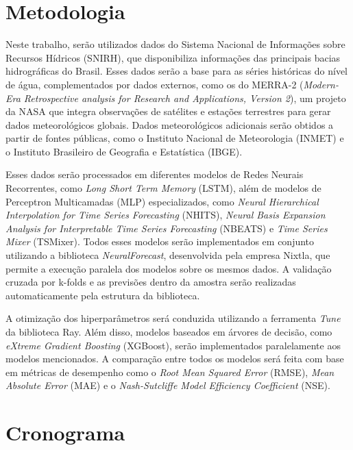 \documentclass[
	12pt,				%
	openright,			%
	a4paper,			%
	english,			%
	french,				%
	spanish,			%
	brazil				%
	]{article}
\begin{document}
\section{Metodologia}
Neste trabalho, serão utilizados dados do Sistema Nacional de Informações sobre Recursos Hídricos (SNIRH), que disponibiliza informações das principais bacias hidrográficas do Brasil\cite{snirh}. Esses dados serão a base para as séries históricas do nível de água, complementados por dados externos, como os do MERRA-2 (\textit{Modern-Era Retrospective analysis for Research and Applications, Version 2}), um projeto da NASA que integra observações de satélites e estações terrestres para gerar dados meteorológicos globais\cite{nasa}. Dados meteorológicos adicionais serão obtidos a partir de fontes públicas, como o Instituto Nacional de Meteorologia (INMET) e o Instituto Brasileiro de Geografia e Estatística (IBGE)\cite{inmet}\cite{ibge}.

Esses dados serão processados em diferentes modelos de Redes Neurais Recorrentes, como \textit{Long Short Term Memory} (LSTM)\cite{hochreiter}, além de modelos de Perceptron Multicamadas (MLP) especializados, como \textit{Neural Hierarchical Interpolation for Time Series Forecasting} (NHITS)\cite{challu}, \textit{Neural Basis Expansion Analysis for Interpretable Time Series Forecasting} (NBEATS)\cite{oreshkin} e \textit{Time Series Mixer} (TSMixer)\cite{chen}. Todos esses modelos serão implementados em conjunto utilizando a biblioteca \textit{NeuralForecast}, desenvolvida pela empresa Nixtla\cite{neuralforecast}, que permite a execução paralela dos modelos sobre os mesmos dados. A validação cruzada por k-folds e as previsões dentro da amostra serão realizadas automaticamente pela estrutura da biblioteca.

A otimização dos hiperparâmetros será conduzida utilizando a ferramenta \textit{Tune} da biblioteca Ray\cite{tune}. Além disso, modelos baseados em árvores de decisão, como \textit{eXtreme Gradient Boosting} (XGBoost)\cite{chen_xgboost}, serão implementados paralelamente aos modelos mencionados. A comparação entre todos os  modelos será feita com base em métricas de desempenho como o \textit{Root Mean Squared Error} (RMSE), \textit{Mean Absolute Error} (MAE) e o \textit{Nash-Sutcliffe Model Efficiency Coefficient} (NSE).
\bigskip

\section{Cronograma}
\end{document}
